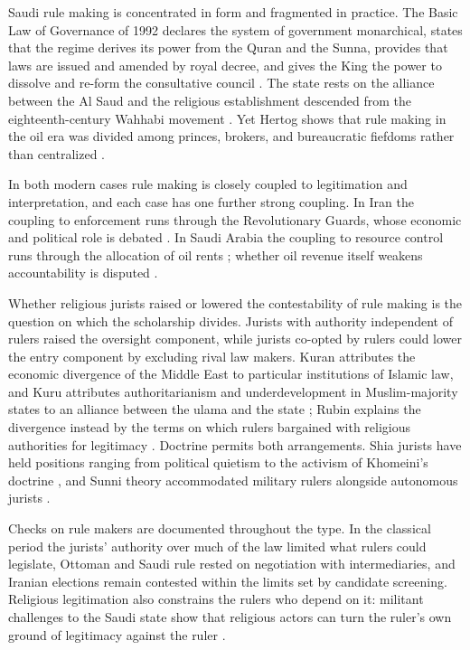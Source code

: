 \documentclass[11pt,letterpaper]{article}
\theoremstyle{definition}
\theoremstyle{remark}
\begin{document}
Saudi rule making is concentrated in form and fragmented in practice. The Basic Law of Governance of 1992 declares the system of government monarchical, states that the regime derives its power from the Quran and the Sunna, provides that laws are issued and amended by royal decree, and gives the King the power to dissolve and re-form the consultative council \citep{saudibasic}. The state rests on the alliance between the Al Saud and the religious establishment descended from the eighteenth-century Wahhabi movement \citep{commins2006,alrasheed2002}. Yet Hertog shows that rule making in the oil era was divided among princes, brokers, and bureaucratic fiefdoms rather than centralized \citep{hertog2010}.

In both modern cases rule making is closely coupled to legitimation and interpretation, and each case has one further strong coupling. In Iran the coupling to enforcement runs through the Revolutionary Guards, whose economic and political role is debated \citep{alfoneh2013}. In Saudi Arabia the coupling to resource control runs through the allocation of oil rents \citep{gause1994}; whether oil revenue itself weakens accountability is disputed \citep{ross2001}.

Whether religious jurists raised or lowered the contestability of rule making is the question on which the scholarship divides. Jurists with authority independent of rulers raised the oversight component, while jurists co-opted by rulers could lower the entry component by excluding rival law makers. Kuran attributes the economic divergence of the Middle East to particular institutions of Islamic law, and Kuru attributes authoritarianism and underdevelopment in Muslim-majority states to an alliance between the ulama and the state \citep{kuran2011,kuru2019}; Rubin explains the divergence instead by the terms on which rulers bargained with religious authorities for legitimacy \citep{rubin2017}. Doctrine permits both arrangements. Shia jurists have held positions ranging from political quietism to the activism of Khomeini's doctrine \citep{arjomand1988}, and Sunni theory accommodated military rulers alongside autonomous jurists \citep{lambton1981}.

Checks on rule makers are documented throughout the type. In the classical period the jurists' authority over much of the law limited what rulers could legislate, Ottoman and Saudi rule rested on negotiation with intermediaries, and Iranian elections remain contested within the limits set by candidate screening. Religious legitimation also constrains the rulers who depend on it: militant challenges to the Saudi state show that religious actors can turn the ruler's own ground of legitimacy against the ruler \citep{hegghammer2010}.
\end{document}
